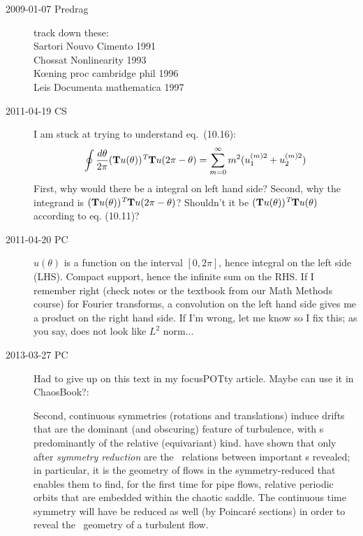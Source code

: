 \begin{description}
\item[2009-01-07 Predrag] track down these: \\
Sartori Nouvo Cimento 1991 \\
Chossat Nonlinearity 1993  \\
K{\oe}ning proc cambridge phil 1996 \\
Leis Documenta mathematica 1997

\item[2011-04-19 CS]
I am stuck at trying to understand eq.~(10.16):
\[
\oint\frac{d\theta}{2\pi}(\textbf{T}u(\theta))^{\emph{T}}\textbf{T}u(2\pi-\theta)
 = \sum\limits_{m=0}^{\infty}m^{2}(u_{1}^{(m)2}+u_{2}^{(m)2})
\]
First, why would there be a integral on left hand side? Second, why the
integrand is $(\textbf{T}u(\theta))^{\emph{T}}\textbf{T}u(2\pi-\theta)$?
Shouldn't it be $(\textbf{T}u(\theta))^{\emph{T}}\textbf{T}u(\theta)$
according to eq. (10.11)?

\item[2011-04-20 PC] $u(\theta)$ is a function on the interval $[0,2\pi]$,
hence integral on the left side (LHS). Compact support, hence the infinite sum
on the RHS. If I remember right (check notes or the textbook from
our Math Methods course) for Fourier transforms, a convolution on the
left hand side gives me a product on the right hand side. If I'm wrong,
let me know so I fix this; as you say, does not look like $L^2$ norm...

\item[2013-03-27 PC] Had to give up on
this text in my focusPOTty article. Maybe can use it in
ChaosBook?:

Second, continuous symmetries (rotations and
translations) induce drifts that are the dominant (and obscuring)
feature of turbulence, with \recFlow s predominantly of the relative
(equivariant) kind. \cite{ACHKW11} have shown that only after
\emph{symmetry reduction} are the \statesp\ relations between
important \recFlow s revealed; in particular, it is the geometry of
flows in the symmetry-reduced {\statesp} that enables them to find,
for the first time for pipe flows, relative periodic orbits that are
embedded within the chaotic saddle.
The continuous time symmetry will
have be reduced as well (by Poincar\'e sections) in order to reveal
the \statesp\ geometry of a turbulent flow.


\end{description}

%

